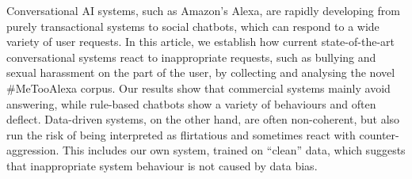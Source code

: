 Conversational AI systems, such as Amazon's Alexa, are rapidly developing from purely transactional systems to social chatbots, which can respond to a wide variety of user requests. In this article, we establish how current state-of-the-art conversational systems react to inappropriate requests, such as bullying and sexual harassment on the part of the user, by collecting and analysing the novel \#MeTooAlexa corpus. Our results show that commercial systems mainly avoid answering, while rule-based chatbots show a variety of behaviours and often deflect. Data-driven systems, on the other hand, are often non-coherent, but also run the risk of being interpreted as flirtatious and sometimes react with counter-aggression. This includes our own system, trained on ``clean'' data, which suggests that inappropriate system behaviour is not caused by data bias.

